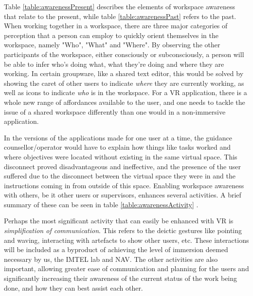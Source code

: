 Table \ref{table:awarenessPresent} describes the elements of workspace awareness that relate to the present, while table \ref{table:awarenessPast} refers to the past. When working together in a workspace, there are three major categories of perception that a person can employ to quickly orient themselves in the workspace, namely "Who", "What" and "Where". By observing the other participants of the workspace, either consciously or subconsciously, a person will be able to infer who's doing what, what they're doing and where they are working. In certain groupware, like a shared text editor, this would be solved by showing the caret of other users to indicate \textit{where} they are currently working, as well as icons to indicate \textit{who} is in the workspace. For a VR application, there is a whole new range of affordances available to the user, and one needs to tackle the issue of a shared workspace differently than one would in a non-immersive application.


In the versions of the applications made for one user at a time, the guidance counsellor/operator would have to explain how things like tasks worked and where objectives were located without existing in the same virtual space. This disconnect proved disadvantageous and ineffective, and the presence of the user suffered due to the disconnect between the virtual space they were in and the instructions coming in from outside of this space. Enabling workspace awareness with others, be it other users or supervisors, enhances several activities. A brief summary of these can be seen in table \ref{table:awarenessActivity} \cite{gutwin2002descriptive}. 

Perhaps the most significant activity that can easily be enhanced with VR is \textit{simplification of communication}. This refers to the deictic gestures like pointing and waving, interacting with artefacts to show other users, etc. These interactions will be included as a byproduct of achieving the level of immersion deemed necessary by us, the IMTEL lab and NAV. The other activities are also important, allowing greater ease of communication and planning for the users and significantly increasing their awareness of the current status of the work being done, and how they can best assist each other.


